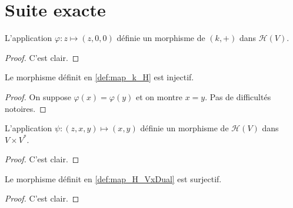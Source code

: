 \section{Suite exacte}

\begin{definition}
    \label{def:map_k_H}
    \leanok 

    L'application $\varphi:z\mapsto (z,0,0)$ définie un morphisme de 
    $(k,+)$ dans $\mathcal{H}(V)$.
    \begin{proof}
        \leanok
        C'est clair.
    \end{proof}
\end{definition}

\begin{proposition}
    \label{prop:inj_map_k_H}
    \leanok 

    Le morphisme définit en \ref{def:map_k_H} est injectif.
    \begin{proof}
        \leanok
        On suppose $\varphi(x)=\varphi(y)$ et on montre $x=y$. Pas de 
        difficultés notoires.
    \end{proof}
\end{proposition}

\begin{definition}
    \label{def:map_H_VxDual}
    \leanok 

    L'application $\psi:(z,x,y)\mapsto (x,y)$ définie un morphisme de 
    $\mathcal{H}(V)$ dans $V\times V^*$.
    \begin{proof}
        \leanok
        C'est clair.
    \end{proof}
\end{definition}

\begin{proposition}
    \label{prop:surj_map_H_VxV*}
    \leanok 

    Le morphisme définit en \ref{def:map_H_VxDual} est surjectif.
    \begin{proof}
        \leanok
        C'est clair.
    \end{proof}
\end{proposition}

